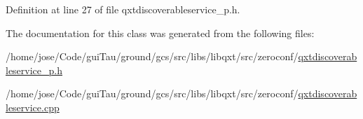 Definition at line 27 of file qxtdiscoverableservice\-\_\-p.\-h.



The documentation for this class was generated from the following files\-:\begin{DoxyCompactItemize}
\item 
/home/jose/\-Code/gui\-Tau/ground/gcs/src/libs/libqxt/src/zeroconf/\hyperlink{qxtdiscoverableservice__p_8h}{qxtdiscoverableservice\-\_\-p.\-h}\item 
/home/jose/\-Code/gui\-Tau/ground/gcs/src/libs/libqxt/src/zeroconf/\hyperlink{qxtdiscoverableservice_8cpp}{qxtdiscoverableservice.\-cpp}\end{DoxyCompactItemize}

